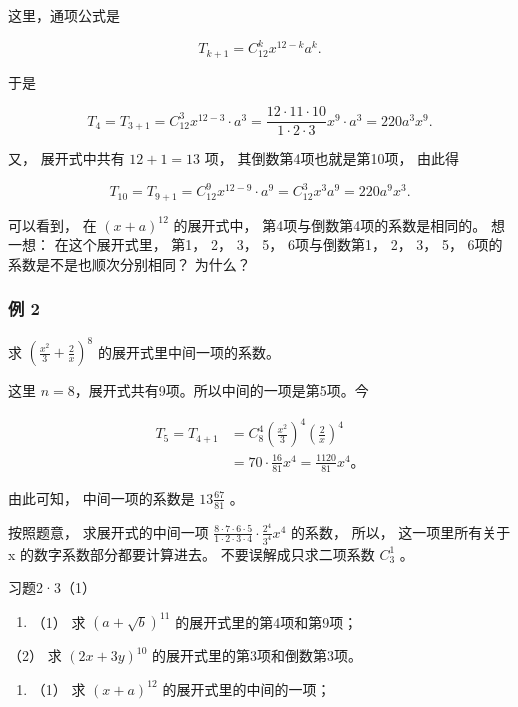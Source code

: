  这里，通项公式是

\[
T _ {k + 1} = C _ {12} ^ {k} x ^ {12 - k} a ^ {k}.
\]

于是

\[
T _ {4} = T _ {3 + 1} = C _ {12} ^ {3} x ^ {12 - 3} \cdot a ^ {3} = \frac {12 \cdot 11 \cdot 10}{1 \cdot 2 \cdot 3} x ^ {9} \cdot a ^ {3} = 220 a ^ {3} x ^ {9}.
\]

又， 展开式中共有 \(12 + 1 = 13\) 项， 其倒数第4项也就是第10项， 由此得

\[
T _ {10} = T _ {9 + 1} = C _ {12} ^ {9} x ^ {12 - 9} \cdot a ^ {9} = C _ {12} ^ {3} x ^ {3} a ^ {9} = 220 a ^ {9} x ^ {3}.
\]

 可以看到， 在 \((x+a)^{12}\) 的展开式中，
第4项与倒数第4项的系数是相同的。 想一想： 在这个展开式里， 第1， 2， 3，
5， 6项与倒数第1， 2， 3， 5， 6项的系数是不是也顺次分别相同？ 为什么？

\subsubsection{例 2}

求 \(\left(\frac{x^2}{3} + \frac{2}{x}\right)^8\)
的展开式里中间一项的系数。

 这里 \(n = 8\)，展开式共有9项。所以中间的一项是第5项。今

\[
\begin{aligned}
T_5=T_{4+1}&=C_8^4\left(\frac{x^2}{3}\right)^4\left(\frac2x\right)^4\\
&=70\cdot\frac{16}{81}x^4=\frac{1120}{81}x^4\text{。}
\end{aligned}
\]

由此可知， 中间一项的系数是 \(13 \frac{67}{81}\) 。


按照题意， 求展开式的中间一项
\(\frac{8\cdot7\cdot6\cdot5}{1\cdot2\cdot3\cdot4}\cdot\frac{2^{4}}{3^{4}}x^{4}\)
的系数， 所以， 这一项里所有关于 x 的数字系数部分都要计算进去。
不要误解成只求二项系数 \(C_{3}^{1}\) 。

习题2·3（1）

\begin{enumerate}
\item
  （1） 求 \((a + \sqrt{b})^{11}\) 的展开式里的第4项和第9项；
\end{enumerate}

（2） 求 \((2x+3y)^{10}\) 的展开式里的第3项和倒数第3项。

\begin{enumerate}[start=2]
\item
  （1） 求 \((x+a)^{12}\) 的展开式里的中间的一项；
\end{enumerate}

